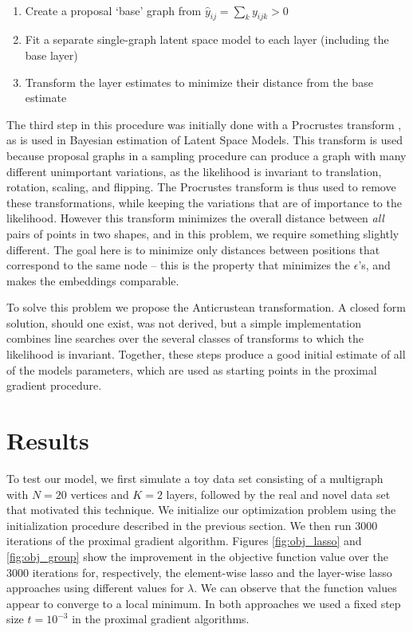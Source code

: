 \documentclass{article}
\begin{document}
\\
\begin{enumerate}
\item Create a proposal `base' graph from $\hat{y}_{ij} =\sum_k y_{ijk} > 0$
\item Fit a separate single-graph latent space model to each layer (including the base layer)
\item Transform the layer estimates to minimize their distance from the base estimate
\end{enumerate}

The third step in this procedure was initially done with a Procrustes transform \cite{Hoff2002}, as is used in Bayesian estimation of Latent Space Models. This transform is used because proposal graphs in a sampling procedure can produce a graph with many different unimportant variations, as the likelihood is invariant to translation, rotation, scaling, and flipping. The Procrustes transform is thus used to remove these transformations, while keeping the variations that are of importance to the likelihood. However this transform minimizes the overall distance between \textit{all} pairs of points in two shapes, and in this problem, we require something slightly different. The goal here is to minimize only distances between positions that correspond to the same node -- this is the property that minimizes the $\epsilon$'s, and makes the embeddings comparable.

To solve this problem we propose the Anticrustean transformation. A closed form solution, should one exist, was not derived, but a simple implementation combines line searches over the several classes of transforms to which the likelihood is invariant. Together, these steps produce a good initial estimate of all of the models parameters, which are used as starting points in the proximal gradient procedure. 


\section{Results}

To test our model, we first simulate a toy data set consisting of a multigraph with $N=20$ vertices and $K=2$ layers, followed by the real and novel data set that motivated this technique. We initialize our optimization problem using the initialization procedure described in the previous section. We then run $3000$ iterations of the proximal gradient algorithm. Figures \ref{fig:obj_lasso} and \ref{fig:obj_group} show the improvement in the objective function value over the 3000 iterations for, respectively, the element-wise lasso and the layer-wise lasso approaches using different values for $\lambda$. We can observe that the function values appear to converge to a local minimum. In both approaches we used a fixed step size $t=10^{-3}$ in the proximal gradient algorithms.
\end{document}
